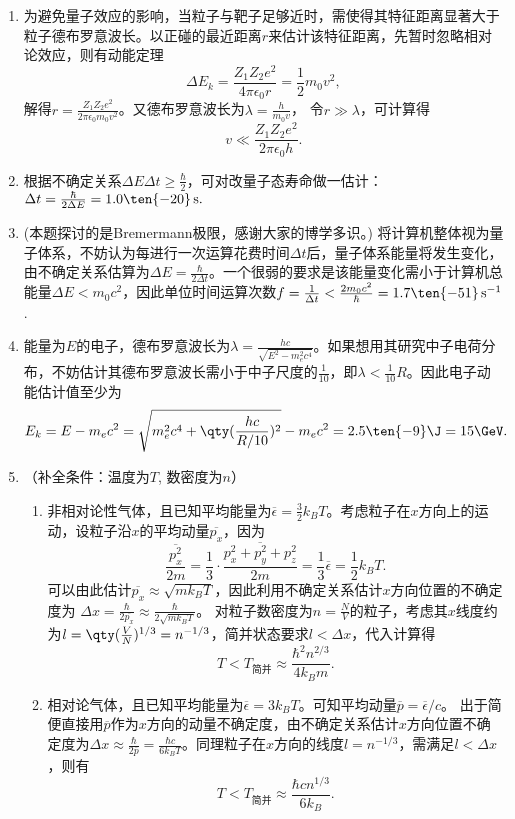 \begin{enumerate}[label=2.\arabic*]
\item
为避免量子效应的影响，当粒子与靶子足够近时，需使得其特征距离显著大于粒子德布罗意波长。以正碰的最近距离$r$来估计该特征距离，先暂时忽略相对论效应，则有动能定理
\[\Delta E_k=\frac{Z_1Z_2e^2}{4\pi\epsilon_0r}=\frac{1}{2}m
_0v^2,\]
解得$r=\frac{Z_1Z_2 e^2}{2\pi\epsilon_0 m_0v^2}$。又德布罗意波长为$\lambda = \frac{h}{m_0v}$，
令$r\gg\lambda$，可计算得
\[v\ll\frac{Z_1Z_2 e^2}{2\pi\epsilon_0 h}.\]

\item
根据不确定关系$\Delta E\Delta t\geq\frac{\hbar}{2}$，可对改量子态寿命做一估计：$\Delta t=\frac{\hbar}{2\Delta E}=1.0\ten{-20}\,\mathrm{s}.$

\item
(本题探讨的是Bremermann极限，感谢大家的博学多识。) 将计算机整体视为量子体系，不妨认为每进行一次运算花费时间$\Delta t$后，量子体系能量将发生变化，由不确定关系估算为$\Delta E=\frac{\hbar}{2\Delta t}$。一个很弱的要求是该能量变化需小于计算机总能量$\Delta E < m_0c^2$，因此单位时间运算次数$f=\frac{1}{\Delta t}<\frac{2m_0 c^2}{\hbar}=1.7\ten{-51}\,\mathrm{s^{-1}}$.

\item
能量为$E$的电子，德布罗意波长为$\lambda=\frac{hc}{\sqrt{E^2-m_e^2c^4}}$。如果想用其研究中子电荷分布，不妨估计其德布罗意波长需小于中子尺度的$\frac{1}{10}$，即$\lambda<\frac{1}{10}R$。因此电子动能估计值至少为
\[E_k = E-m_ec^2 = \sqrt{m_e^2c^4+\qty(\frac{hc}{R/10})^2}-m_ec^2 = 2.5\ten{-9}\J=15\GeV.\]

\item
（补全条件：温度为$T$, 数密度为$n$）

\begin{enumerate}[label=(\arabic*)]
\item 非相对论性气体，且已知平均能量为$\overline{\epsilon}=\frac{3}{2}k_B T$。考虑粒子在$x$方向上的运动，设粒子沿$x$的平均动量$\overline{p_x}$，因为
\[\frac{\overline{p_x^2}}{2m}
=\frac{1}{3}\cdot\frac{\overline{p_x^2+p_y^2+p_z^2}}{2m}
=\frac{1}{3} \overline{\epsilon}=\frac{1}{2}k_B T.\]
可以由此估计$\overline{p_x}\approx \sqrt{mk_B T}$，因此利用不确定关系估计$x$方向位置的不确定度为
$\Delta x = \frac{\hbar}{2\overline{p_x}}\approx\frac{\hbar}{2\sqrt{mk_B T}}$。
对粒子数密度为$n=\frac{N}{V}$的粒子，考虑其$x$线度约为$l=\qty(\frac{V}{N})^{1/3}=n^{-1/3}$，简并状态要求$l<\Delta x$，代入计算得
\[T<T_{\text{简并}}\approx\frac{\hbar^2 n^{2/3}}{4 k_B m}.\]

\item 相对论气体，且已知平均能量为$\overline{\epsilon}=3k_B T$。可知平均动量$\overline{p}=\overline{\epsilon}/c$。
出于简便直接用$\overline{p}$作为$x$方向的动量不确定度，由不确定关系估计$x$方向位置不确定度为$\Delta x\approx \frac{\hbar}{2\overline{p}}=\frac{\hbar c}{6k_B T}$。同理粒子在$x$方向的线度$l=n^{-1/3}$，需满足$l<\Delta x $，则有
\[T<T_{\text{简并}}\approx\frac{\hbar c n^{1/3}}{6k_B}.\]
\end{enumerate}


\end{enumerate}
